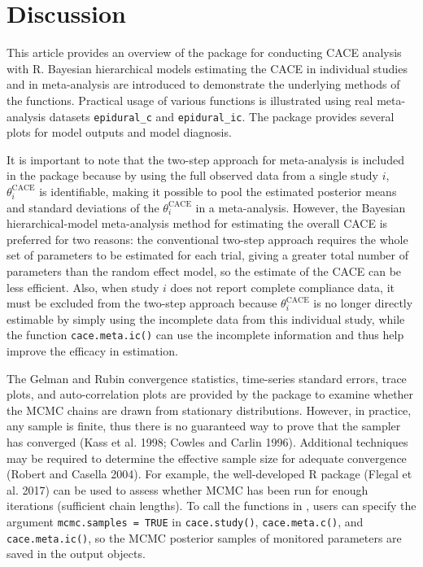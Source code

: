 \hypertarget{discussion}{%
\section{Discussion}\label{discussion}}

This article provides an overview of the  package for conducting CACE analysis with R. Bayesian hierarchical models estimating the CACE in individual studies and in meta-analysis are introduced to demonstrate the underlying methods of the functions. Practical usage of various functions is illustrated using real meta-analysis datasets \texttt{epidural\_c} and \texttt{epidural\_ic}. The package provides several plots for model outputs and model diagnosis.

It is important to note that the two-step approach for meta-analysis is included in the package  because by using the full observed data from a single study \(i\), \(\theta^\text{CACE}_i\) is identifiable, making it possible to pool the estimated posterior means and standard deviations of the \(\theta^\text{CACE}_i\) in a meta-analysis. However, the Bayesian hierarchical-model meta-analysis method for estimating the overall CACE is preferred for two reasons: the conventional two-step approach requires the whole set of parameters to be estimated for each trial, giving a greater total number of parameters than the random effect model, so the estimate of the CACE can be less efficient. Also, when study \(i\) does not report complete compliance data, it must be excluded from the two-step approach because \(\theta^\text{CACE}_i\) is no longer directly estimable by simply using the incomplete data from this individual study, while the function \texttt{cace.meta.ic()} can use the incomplete information and thus help improve the efficacy in estimation.

The Gelman and Rubin convergence statistics, time-series standard errors, trace plots, and auto-correlation plots are provided by the package  to examine whether the MCMC chains are drawn from stationary distributions. However, in practice, any sample is finite, thus there is no guaranteed way to prove that the sampler has converged (Kass et al. 1998; Cowles and Carlin 1996).
Additional techniques may be required to determine the effective sample size for adequate convergence (Robert and Casella 2004). For example, the well-developed R package  (Flegal et al. 2017) can be used to assess whether MCMC has been run for enough iterations (sufficient chain lengths). To call the functions in , users can specify the argument \texttt{mcmc.samples\ =\ TRUE} in \texttt{cace.study()}, \texttt{cace.meta.c()}, and \texttt{cace.meta.ic()}, so the MCMC posterior samples of monitored parameters are saved in the output objects.


